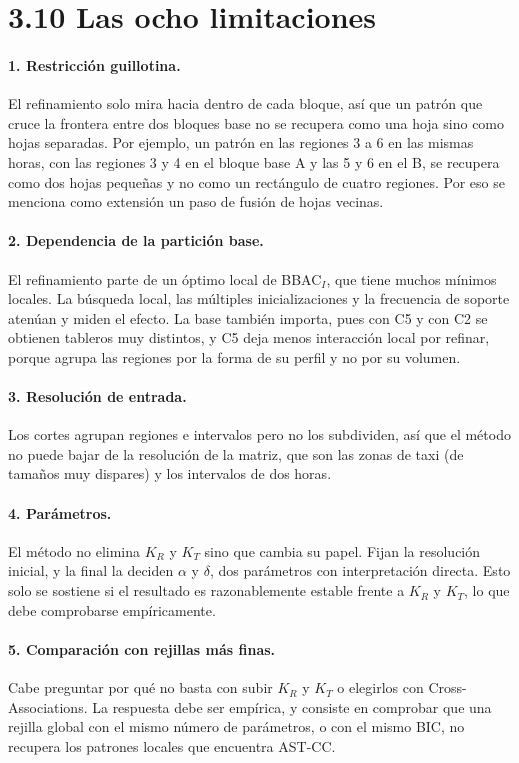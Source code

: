 \documentclass[11pt,a4paper]{article}
\begin{document}
\section{3.10 Las ocho limitaciones}

\paragraph{1. Restricción guillotina.} El refinamiento solo mira hacia dentro de cada
bloque, así que un patrón que cruce la frontera entre dos bloques base no se recupera
como una hoja sino como hojas separadas. Por ejemplo, un patrón en las regiones 3 a 6 en
las mismas horas, con las regiones 3 y 4 en el bloque base A y las 5 y 6 en el B, se
recupera como dos hojas pequeñas y no como un rectángulo de cuatro regiones. Por eso se
menciona como extensión un paso de fusión de hojas vecinas.

\paragraph{2. Dependencia de la partición base.} El refinamiento parte de un óptimo
local de BBAC$_I$, que tiene muchos mínimos locales. La búsqueda local, las múltiples
inicializaciones y la frecuencia de soporte atenúan y miden el efecto. La base también
importa, pues con C5 y con C2 se obtienen tableros muy distintos, y C5 deja menos
interacción local por refinar, porque agrupa las regiones por la forma de su perfil y no
por su volumen.

\paragraph{3. Resolución de entrada.} Los cortes agrupan regiones e intervalos pero no
los subdividen, así que el método no puede bajar de la resolución de la matriz, que son
las zonas de taxi (de tamaños muy dispares) y los intervalos de dos horas.

\paragraph{4. Parámetros.} El método no elimina $K_R$ y $K_T$ sino que cambia su
papel. Fijan la resolución inicial, y la final la deciden $\alpha$ y $\delta$, dos
parámetros con interpretación directa. Esto solo se sostiene si el resultado es
razonablemente estable frente a $K_R$ y $K_T$, lo que debe comprobarse empíricamente.

\paragraph{5. Comparación con rejillas más finas.} Cabe preguntar por qué no basta con
subir $K_R$ y $K_T$ o elegirlos con Cross-Associations. La respuesta debe ser empírica, y
consiste en comprobar que una rejilla global con el mismo número de parámetros, o con el
mismo BIC, no recupera los patrones locales que encuentra AST-CC.
\end{document}
